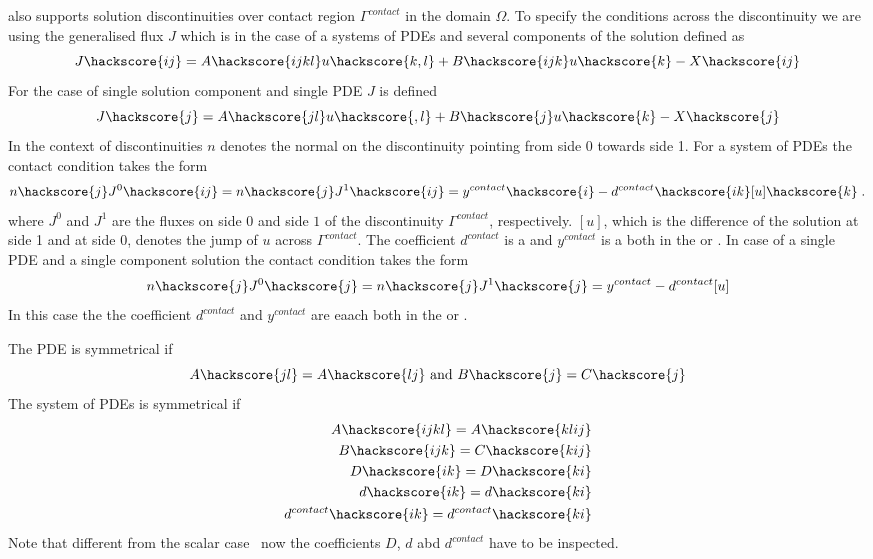 \LinearPDE also supports solution discontinuities  over contact region $\Gamma^{contact}$
in the domain $\Omega$. To specify the conditions across the discontinuity we are using the
generalised flux $J$ which is in the case of a systems of PDEs and several components of the solution
defined as 
\begin{equation}\label{LINEARPDE.SYSTEM.5}
J\hackscore{ij}=A\hackscore{ijkl}u\hackscore{k,l}+B\hackscore{ijk}u\hackscore{k}-X\hackscore{ij}
\end{equation}
For the case of single solution component and single PDE $J$ is defined
\begin{equation}\label{LINEARPDE.SINGLE.5}
J\hackscore{j}=A\hackscore{jl}u\hackscore{,l}+B\hackscore{j}u\hackscore{k}-X\hackscore{j}
\end{equation}
In the context of discontinuities  $n$ denotes the normal on the 
discontinuity pointing from side 0 towards side 1. For a system of PDEs
the contact condition takes the form
\begin{equation}\label{LINEARPDE.SYSTEM.6}
n\hackscore{j} J^{0}\hackscore{ij}=n\hackscore{j} J^{1}\hackscore{ij}=y^{contact}\hackscore{i} - d^{contact}\hackscore{ik} [u]\hackscore{k} \; .
\end{equation}
where $J^{0}$ and $J^{1}$ are the fluxes on side $0$ and side $1$ of the
discontinuity $\Gamma^{contact}$, respectively. $[u]$, which is the difference
of the solution at side 1 and at side 0, denotes the jump of $u$ across $\Gamma^{contact}$.
The coefficient $d^{contact}$ is a \RankTwo and $y^{contact}$ is a  
\RankOne both in the \FunctionOnContactZero or \FunctionOnContactOne.
In case of a single PDE and a single component solution the contact condition takes the form
\begin{equation}\label{LINEARPDE.SINGLE.6}
n\hackscore{j} J^{0}\hackscore{j}=n\hackscore{j} J^{1}\hackscore{j}=y^{contact} - d^{contact}[u]
\end{equation}
In this case the the coefficient $d^{contact}$ and $y^{contact}$ are eaach \Scalar
both in the \FunctionOnContactZero or \FunctionOnContactOne.

The PDE is symmetrical  if
\begin{equation}\label{LINEARPDE.SINGLE.4}
A\hackscore{jl}=A\hackscore{lj} \mbox{ and } B\hackscore{j}=C\hackscore{j}
\end{equation}
The system of PDEs is symmetrical  if
\begin{eqnarray}
\label{LINEARPDE.SYSTEM.4}
A\hackscore{ijkl}=A\hackscore{klij} \\
B\hackscore{ijk}=C\hackscore{kij} \\
D\hackscore{ik}=D\hackscore{ki} \\
d\hackscore{ik}=d\hackscore{ki} \\
d^{contact}\hackscore{ik}=d^{contact}\hackscore{ki} 
\end{eqnarray}
Note that different from the scalar case~ now the coefficients $D$, $d$ abd $d^{contact}$
have to be inspected.

